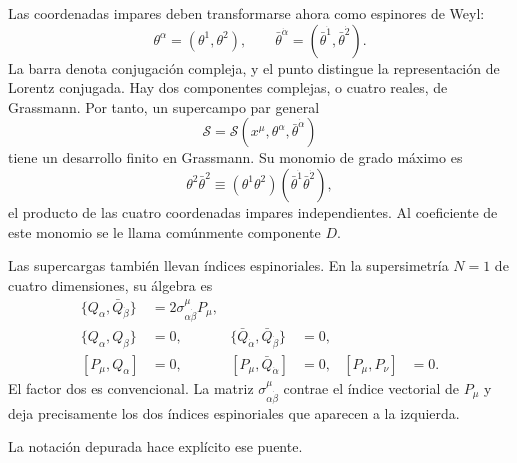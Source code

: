 Las coordenadas impares deben transformarse ahora como espinores de Weyl:
\begin{equation}
\theta^\alpha=(\theta^1,\theta^2),
\qquad
\bar\theta^{\dot\alpha}=(\bar\theta^{\dot1},\bar\theta^{\dot2}).
\end{equation}
La barra denota conjugación compleja, y el punto distingue la representación de Lorentz conjugada. Hay dos componentes complejas, o cuatro reales, de Grassmann. Por tanto, un supercampo par general
\begin{equation}
\mathcal S=\mathcal S(x^\mu,\theta^\alpha,\bar\theta^{\dot\alpha})
\end{equation}
tiene un desarrollo finito en Grassmann. Su monomio de grado máximo es
\begin{equation}
\theta^2\bar\theta^2
\equiv
(\theta^1\theta^2)(\bar\theta^{\dot1}\bar\theta^{\dot2}),
\end{equation}
el producto de las cuatro coordenadas impares independientes. Al coeficiente de este monomio se le llama comúnmente componente \(D\).

Las supercargas también llevan índices espinoriales. En la supersimetría \(N=1\) de cuatro dimensiones, su álgebra es
\begin{align}
\{Q_\alpha,\bar Q_{\dot\beta}\}
&=2\sigma^\mu_{\alpha\dot\beta}P_\mu,
\label{eq:l8-superalgebra-main}\\
\{Q_\alpha,Q_\beta\}&=0,
&
\{\bar Q_{\dot\alpha},\bar Q_{\dot\beta}\}&=0,
\label{eq:l8-superalgebra-nilpotent}\\
[P_\mu,Q_\alpha]&=0,
&
[P_\mu,\bar Q_{\dot\alpha}]&=0,
&
[P_\mu,P_\nu]&=0.
\label{eq:l8-superalgebra-commutators}
\end{align}
El factor dos es convencional. La matriz
\(\sigma^\mu_{\alpha\dot\beta}\) contrae el índice vectorial de \(P_\mu\) y deja precisamente los dos índices espinoriales que aparecen a la izquierda.

\begin{classroomqa}
\end{classroomqa}

La notación depurada hace explícito ese puente.

